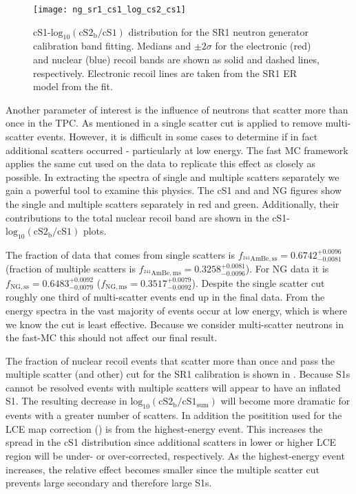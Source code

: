\begin{figure}
\centering
\texttt{[image: ng\_sr1\_cs1\_log\_cs2\_cs1]}
\caption{cS1-$\mathrm{log}_{10}(\mathrm{cS2_b / cS1})$ distribution for the SR1 neutron generator calibration band fitting.  Medians and
$\pm 2\sigma$ for the electronic (red) and nuclear (blue) recoil bands are shown as solid and dashed lines, respectively.  Electronic
recoil lines are taken from the SR1 ER model from the fit.}
\label{fig:er_nr_calibrations_results_ng_sr1_cs1_log_cs2_cs1}
\end{figure}

Another parameter of interest is the influence of neutrons that scatter more than once in the TPC.  As mentioned in
 a single scatter cut is applied to remove multi-scatter events.  However,
it is difficult in some cases to determine if in fact additional scatters occurred - particularly at low energy.  The fast MC
framework applies the same cut used on the data to replicate this effect as closely as possible.  In extracting the spectra of single and
multiple scatters separately we gain a powerful tool to examine this physics.  The cS1 and \cstwob \ambe and NG figures show the single
and multiple scatters separately in red and green.  Additionally, their contributions to the total nuclear recoil band are shown in
the cS1-$\mathrm{log}_{10}(\mathrm{cS2_b/cS1})$ plots.

The fraction of \ambe data that comes from single scatters is $f_{\mathrm{^{241}AmBe, ss}} = 0.6742_{-0.0081}^{+0.0096}$
(fraction of multiple scatters is $f_{\mathrm{^{241}AmBe, ms}} = 0.3258_{-0.0096}^{+0.0081}$).  For NG data it is
$f_{\mathrm{NG, ss}} = 0.6483_{-0.0079}^{+0.0092}$ ($f_{\mathrm{NG, ms}} = 0.3517_{-0.0092}^{+0.0079}$).  Despite the single scatter cut
roughly one third of multi-scatter events end up in the final data.  From the energy spectra in
 the vast majority of events occur at low energy, which is where
we know the cut is least effective.  Because we consider multi-scatter neutrons in the fast-MC this should not affect our final
result.

The fraction of nuclear recoil events that scatter more than once and pass the multiple scatter (and other) cut for the SR1 \ambe
calibration is shown in
.  Because S1s cannot be resolved events with multiple scatters will appear to have an
inflated S1.  The resulting decrease in $\mathrm{log}_{10}(\mathrm{cS2_b / cS1_{sum}})$ will become more dramatic for events with a
greater number of scatters.  In addition the positition used for the LCE map correction
() is from the highest-energy event.  This
increases the spread in the cS1 distribution since additional scatters in lower or higher LCE region will be under- or over-corrected,
respectively.  As the highest-energy event increases, the relative effect becomes smaller since the multiple scatter cut prevents large
secondary \stwob and therefore large S1s.

